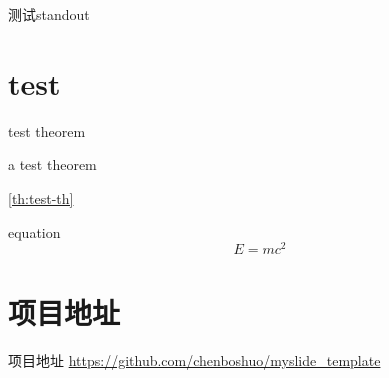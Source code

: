 \begin{frame}[standout]
	测试standout
\end{frame}

\section{test}
	\begin{frame}{test theorem}
		\begin{theorem}
			a test theorem
			\label{th:test-th}
		\end{theorem}
		\cref{th:test-th}
	\end{frame}

	\begin{frame}{equation}
		\begin{equation}
			E = mc^2
		\end{equation}
	\end{frame}

\section{项目地址}
\hideLogo
\begin{frame}{项目地址}
	\url{https://github.com/chenboshuo/myslide_template}
\end{frame}
